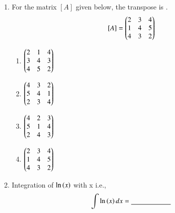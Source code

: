 \documentclass[journal,12pt,onecolumn]{article}
\theoremstyle{remark}
\begin{document}
\begin{enumerate}
    \hfill{}
    \begin{enumerate}
    \end{enumerate}

    \item For the matrix $[A]$ given below, the transpose is \underline{\hspace{2cm}}.
    \[ [A] = \begin{pmatrix}2 & 3 & 4 \\ 1 & 4 & 5 \\ 4 & 3 & 2\end{pmatrix} \]

    \hfill{}
    \begin{enumerate}
        \item $\begin{pmatrix}2 & 1 & 4 \\ 3 & 4 & 3 \\ 4 & 5 & 2\end{pmatrix}$
        \item $\begin{pmatrix}4 & 3 & 2 \\ 5 & 4 & 1 \\ 2 & 3 & 4\end{pmatrix}$
        \item $\begin{pmatrix}4 & 2 & 3 \\ 5 & 1 & 4 \\ 2 & 4 & 3\end{pmatrix}$
        \item $\begin{pmatrix}2 & 3 & 4 \\ 1 & 4 & 5 \\ 4 & 3 & 2\end{pmatrix}$
    \end{enumerate}

    \item Integration of $\ln\left(x\right)$ with x i.e.,
    \begin{align} \int \ln\left(x\right) dx = \underline{\hspace{2cm}} \end{align}

    \hfill{}
    \begin{enumerate}
    \end{enumerate}


\end{enumerate}
\end{document}
